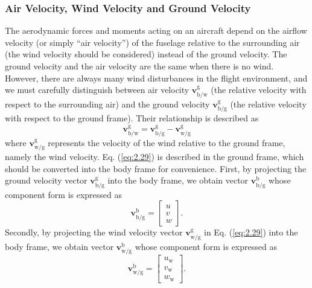 \subsubsection{Air Velocity, Wind Velocity and Ground Velocity}

The aerodynamic forces and moments acting on an aircraft depend on
the airflow velocity (or simply \textquotedblleft air velocity\textquotedblright )
of the fuselage relative to the surrounding air (the wind velocity
should be considered) instead of the ground velocity. The ground velocity
and the air velocity are the same when there is no wind. However,
there are always many wind disturbances in the flight environment,
and we must carefully distinguish between air velocity $\mathbf{v}_{\text{{b}/{w}}}^{\text{g}}$
(the relative velocity with respect to the surrounding air) and the
ground velocity $\mathbf{v}_{\text{{b}/{g}}}^{\text{g}}$ (the relative
velocity with respect to the ground frame). Their relationship is
described as
\begin{equation}
\mathbf{v}_{\text{{b}/{w}}}^{\text{g}}=\mathbf{v}_{\text{{b}/{g}}}^{\text{g}}-\mathbf{v}_{\text{{w}/{g}}}^{\text{g}}\label{eq:2.29}
\end{equation}
where $\mathbf{v}_{\text{{w}/{g}}}^{\text{g}}$ represents the velocity
of the wind relative to the ground frame, namely the wind velocity.
Eq. (\ref{eq:2.29}) is described in the ground frame, which should
be converted into the body frame for convenience. First, by projecting
the ground velocity vector $\mathbf{v}_{\text{{b}/{g}}}^{\text{g}}$
into the body frame, we obtain vector $\mathbf{v}_{\text{{b}/{g}}}^{\text{b}}$
whose component form is expressed as
\begin{equation}
\mathbf{v}_{\text{{b}/{g}}}^{\text{b}}=\left[\begin{array}{c}
u\\
v\\
w
\end{array}\right].\label{eq:2.30}
\end{equation}
Secondly, by projecting the wind velocity vector $\mathbf{v}_{\text{{w}/{g}}}^{\text{g}}$
in Eq. (\ref{eq:2.29}) into the body frame, we obtain vector $\mathbf{v}_{\text{{w}/{g}}}^{\text{b}}$
whose component form is expressed as
\begin{equation}
\mathbf{v}_{\text{{w}/{g}}}^{\text{b}}=\left[\begin{array}{c}
{u}_{\text{w}}\\
{v}_{\text{w}}\\
{w}_{\text{w}}
\end{array}\right].\label{eq:3.31}
\end{equation}
